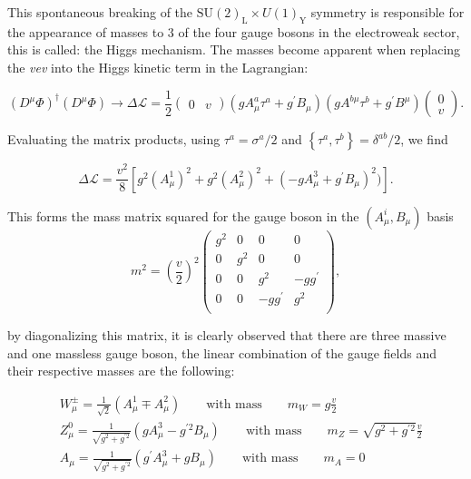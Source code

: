 This spontaneous breaking of the $\mathrm{SU(2)_{L}}\times
U(1)_{\mathrm{Y}}$ symmetry is responsible for the appearance of
masses to 3 of the four gauge bosons in the electroweak sector, this
is called: the Higgs mechanism. The masses become apparent when
replacing the \textit{vev} into the Higgs kinetic term in the
Lagrangian:

\begin{equation}
\label{eq:HiggsMass}
(D^{\mu}\Phi)^{\dagger}(D^{\mu}\Phi) \rightarrow
\Delta\mathcal{L} = \frac{1}{2}\begin{pmatrix} 0 & v\end{pmatrix} (gA_{\mu}^{a}\tau^{a} + g^{\prime}B_{\mu})(gA^{b\mu}\tau^{b} +g^{\prime}B^{\mu}) \begin{pmatrix} 0\\
  v\end{pmatrix}.
\end{equation}

Evaluating the matrix products, using $\tau^{a}=\sigma^{a}/2$ and
$\left\{\tau^{a},\tau^{b}\right\} = \delta^{ab}/2$, we find

 
\begin{equation}
\label{eq:HiggsMass2}
\Delta\mathcal{L} = \frac{\mathit{v}^{2}}{8}\left[g^{2}(A^{1}_{\mu})^2
  +g^{2}(A^{2}_{\mu})^2 + (-gA^{3}_{\mu}+g^{\prime}B_{\mu})^2)\right].
\end{equation}

This forms the mass matrix squared for the gauge boson in the
$(A^{i}_{\mu}, B_{\mu})$ basis
\begin{equation}
\label{eq:HiggsMass}
m^{2} = \left(\frac{v}{2}\right)^{2}
\begin{pmatrix} g^{2} & 0 & 0 & 0\\
0 & g^{2} & 0 & 0\\
0 & 0 & g^{2} & -gg^{\prime}\\
0 & 0 & -gg^{\prime} & g^{2}\\
\end{pmatrix},
\end{equation}

by diagonalizing this matrix, it is clearly observed that there are three
massive and one massless gauge boson, the linear combination of the
gauge fields and their respective masses are the following:

\begin{equation}
 \begin{aligned}
       &W^{\pm}_{\mu} = \frac{1}{\sqrt{2}}(A^{1}_{\mu}\mp A^{2}_{\mu})
        \qquad \text{with mass}  \qquad  m_{W} = g\frac{v}{2}\\
        & 
        Z^{0}_{\mu} = \frac{1}{\sqrt{g^{2}+g^{\prime
              2}}}(gA^{3}_{\mu}- g^{\prime 2}B_{\mu})
        \qquad \text{with mass}  \qquad  m_{Z} = \sqrt{g^{2}+g^{\prime
            2}}\frac{v}{2}\\
        &
        A_{\mu} = \frac{1}{\sqrt{g^{2}+g^{\prime
              2}}}(g^{\prime}A^{3}_{\mu}+ gB_{\mu})
        \qquad \text{with mass}  \qquad  m_{A} = 0
       \end{aligned}
\label{eq:BosonMasses}
\end{equation}

